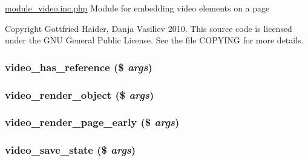 \hyperlink{module__video_8inc_8php}{module\_\-video.inc.php} Module for embedding video elements on a page

Copyright Gottfried Haider, Danja Vasiliev 2010. This source code is licensed under the GNU General Public License. See the file COPYING for more details. \hypertarget{module__video_8inc_8php_dbbede5e492ca7b9457deaf076c887b0}{
\subsubsection[{video\_\-has\_\-reference}]{\setlength{\rightskip}{0pt plus 5cm}video\_\-has\_\-reference (\$ {\em args})}}
\label{module__video_8inc_8php_dbbede5e492ca7b9457deaf076c887b0}


\hypertarget{module__video_8inc_8php_14d6bc200a41905ad201a24d9a2d9be5}{
\subsubsection[{video\_\-render\_\-object}]{\setlength{\rightskip}{0pt plus 5cm}video\_\-render\_\-object (\$ {\em args})}}
\label{module__video_8inc_8php_14d6bc200a41905ad201a24d9a2d9be5}


\hypertarget{module__video_8inc_8php_223ac9bac4acfb2c9b458b43e45e06e3}{
\subsubsection[{video\_\-render\_\-page\_\-early}]{\setlength{\rightskip}{0pt plus 5cm}video\_\-render\_\-page\_\-early (\$ {\em args})}}
\label{module__video_8inc_8php_223ac9bac4acfb2c9b458b43e45e06e3}


\hypertarget{module__video_8inc_8php_828b4f740b870b886936a22baf97418e}{
\subsubsection[{video\_\-save\_\-state}]{\setlength{\rightskip}{0pt plus 5cm}video\_\-save\_\-state (\$ {\em args})}}
\label{module__video_8inc_8php_828b4f740b870b886936a22baf97418e}


